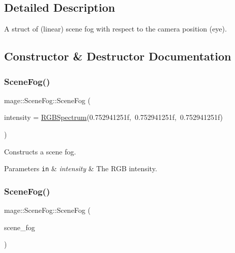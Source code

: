 \subsection{Detailed Description}
A struct of (linear) scene fog with respect to the camera position (eye). 

\subsection{Constructor \& Destructor Documentation}
\hypertarget{structmage_1_1_scene_fog_a8d7c8ab962ca172a5bca7115131f6afc}{}\label{structmage_1_1_scene_fog_a8d7c8ab962ca172a5bca7115131f6afc} 
\subsubsection{\texorpdfstring{Scene\+Fog()}{SceneFog()}\hspace{0.1cm}{\footnotesize\ttfamily [1/3]}}
{\footnotesize\ttfamily mage\+::\+Scene\+Fog\+::\+Scene\+Fog (\begin{DoxyParamCaption}\item[{const \hyperlink{structmage_1_1_r_g_b_spectrum}{R\+G\+B\+Spectrum} \&}]{intensity = {\ttfamily \hyperlink{structmage_1_1_r_g_b_spectrum}{R\+G\+B\+Spectrum}(0.752941251f,~0.752941251f,~0.752941251f)} }\end{DoxyParamCaption})\hspace{0.3cm}{\ttfamily [explicit]}}

Constructs a scene fog.


\begin{DoxyParams}[1]{Parameters}
\mbox{\tt in}  & {\em intensity} & The R\+GB intensity. \\
\hline
\end{DoxyParams}
\hypertarget{structmage_1_1_scene_fog_a203934b340b718f9b6f136100df62268}{}\label{structmage_1_1_scene_fog_a203934b340b718f9b6f136100df62268} 
\subsubsection{\texorpdfstring{Scene\+Fog()}{SceneFog()}\hspace{0.1cm}{\footnotesize\ttfamily [2/3]}}
{\footnotesize\ttfamily mage\+::\+Scene\+Fog\+::\+Scene\+Fog (\begin{DoxyParamCaption}\item[{const \hyperlink{structmage_1_1_scene_fog}{Scene\+Fog} \&}]{scene\+\_\+fog }\end{DoxyParamCaption})\hspace{0.3cm}{\ttfamily [default]}}


